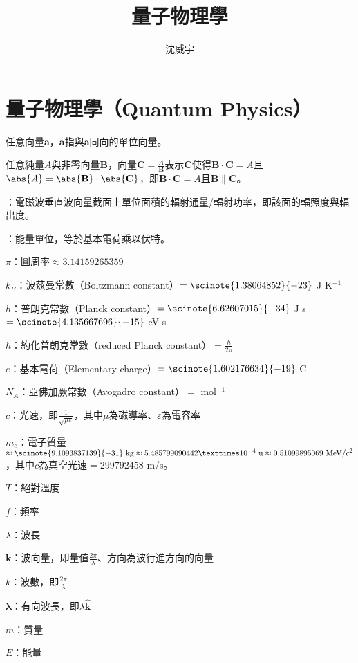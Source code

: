 \documentclass[a4paper,12pt]{article}
\begin{document}
\title{量子物理學}
\author{沈威宇}
\date{\temtoday}
\titletocdoc
\section{量子物理學（Quantum Physics）}
\bit
\item 任意向量$\mathbf{a}$，$\hat{\mathbf{a}}$指與$\mathbf{a}$同向的單位向量。
\item 任意純量$A$與非零向量$\mathbf{B}$，向量$\mathbf{C}=\frac{A}{\mathbf{B}}$表示$\mathbf{C}$使得$\mathbf{B}\cdot \mathbf{C}=A$且$\abs{A}=\abs{\mathbf{B}}\cdot \abs{\mathbf{C}}$，即$\mathbf{B}\cdot \mathbf{C}=A$且$\mathbf{B}\parallel\mathbf{C}$。
\item {}：電磁波垂直波向量截面上單位面積的輻射通量/輻射功率，即該面的輻照度與輻出度。
\item {}：能量單位，等於基本電荷乘以伏特。
\item $\pi$：圓周率$\approx 3.14159265359$
\item $k_B$：波茲曼常數（Boltzmann constant）$=\scinote{1.38064852}{-23}$ J K$^{-1}$
\item $h$：普朗克常數（Planck constant）$=\scinote{6.62607015}{-34}$ J s $=\scinote{4.135667696}{-15}$ eV s
\item $\hbar$：約化普朗克常數（reduced Planck constant）$=\frac{h}{2\pi}$
\item $e$：基本電荷（Elementary charge）$=\scinote{1.602176634}{-19}$ C
\item $N_A$：亞佛加厥常數（Avogadro constant）$=$ mol$^{-1}$
\item $c$：光速，即$\frac{1}{\sqrt{\mu\varepsilon}}$，其中$\mu$為磁導率、$\varepsilon$為電容率
\item $m_e$：電子質量$\approx\scinote{9.1093837139}{-31}\text{\ kg}\approx5.485799090442×10^{-4}\text{\ u}\approx0.51099895069\text{\ MeV/}c^2$，其中$c$為真空光速$=299792458$ m/s。
\item $T$：絕對溫度
\item $f$：頻率
\item $\lambda$：波長
\item $\mathbf{k}$：波向量，即量值$\frac{2\pi}{\lambda}$、方向為波行進方向的向量
\item $k$：波數，即$\frac{2\pi}{\lambda}$
\item $\boldsymbol{\lambda}$：有向波長，即$\lambda\hat{\mathbf{k}}$
\item $m$：質量
\item $E$：能量
\end{document}
